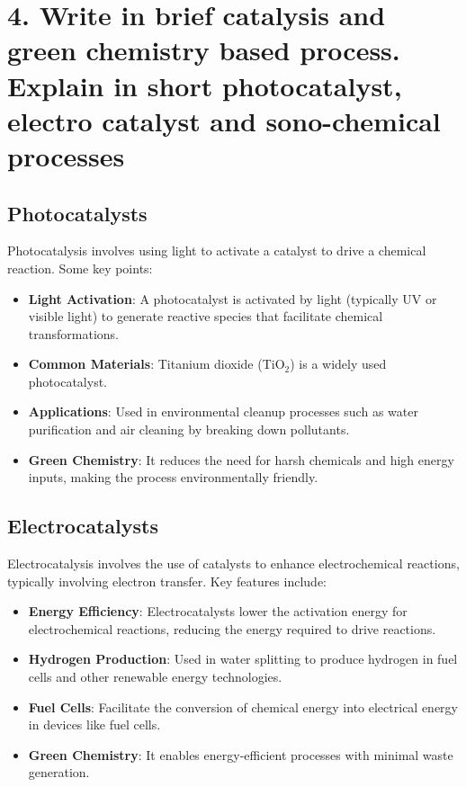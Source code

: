 \documentclass[11pt]{article}
\begin{document}
\section{4. Write in brief catalysis and green chemistry based process. Explain in short photocatalyst, electro catalyst and sono-chemical processes}
\subsection{Photocatalysts}
Photocatalysis involves using light to activate a catalyst to drive a chemical reaction. Some key points:
\begin{itemize}
    \item \textbf{Light Activation}: A photocatalyst is activated by light (typically UV or visible light) to generate reactive species that facilitate chemical transformations.
    \item \textbf{Common Materials}: Titanium dioxide (TiO\(_2\)) is a widely used photocatalyst.
    \item \textbf{Applications}: Used in environmental cleanup processes such as water purification and air cleaning by breaking down pollutants.
    \item \textbf{Green Chemistry}: It reduces the need for harsh chemicals and high energy inputs, making the process environmentally friendly.
\end{itemize}

\subsection{Electrocatalysts}
Electrocatalysis involves the use of catalysts to enhance electrochemical reactions, typically involving electron transfer. Key features include:
\begin{itemize}
    \item \textbf{Energy Efficiency}: Electrocatalysts lower the activation energy for electrochemical reactions, reducing the energy required to drive reactions.
    \item \textbf{Hydrogen Production}: Used in water splitting to produce hydrogen in fuel cells and other renewable energy technologies.
    \item \textbf{Fuel Cells}: Facilitate the conversion of chemical energy into electrical energy in devices like fuel cells.
    \item \textbf{Green Chemistry}: It enables energy-efficient processes with minimal waste generation.
\end{itemize}
\end{document}

